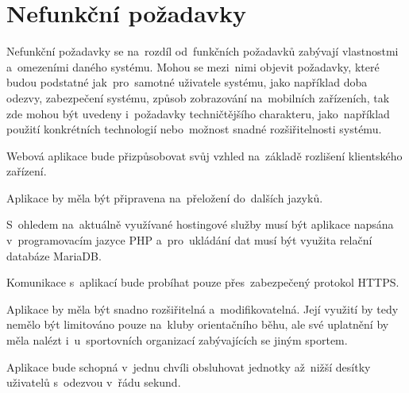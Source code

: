 \section{Nefunkční požadavky}
Nefunkční požadavky se na~rozdíl od~funkčních požadavků zabývají vlastnostmi a~omezeními daného systému. Mohou se mezi~nimi objevit požadavky, které budou podstatné jak~pro~samotné uživatele systému, jako například doba odezvy, zabezpečení systému, způsob zobrazování na~mobilních zařízeních, tak zde mohou být uvedeny i~požadavky techničtějšího charakteru, jako~například použití konkrétních technologií nebo~možnost snadné rozšiřitelnosti systému. \cite{requirements}

\begin{enumerate}[label=\textcolor{decoration}{\textbf{N\arabic*}}, leftmargin=7mm]
	Webová aplikace bude přizpůsobovat svůj vzhled na~základě rozlišení klientského zařízení.

	Aplikace by měla být připravena na~přeložení do~dalších jazyků.

	S~ohledem na~aktuálně využívané hostingové služby musí být aplikace napsána v~programovacím jazyce PHP a~pro~ukládání dat musí být využita relační databáze MariaDB.

	Komunikace s~aplikací bude probíhat pouze přes~zabezpečený protokol HTTPS.

	Aplikace by měla být snadno rozšiřitelná a~modifikovatelná. Její využití by tedy nemělo být limitováno pouze na~kluby orientačního běhu, ale své uplatnění by měla nalézt i~u~sportovních organizací zabývajících se jiným sportem.

	Aplikace bude schopná v~jednu chvíli obsluhovat jednotky až~nižší desítky uživatelů s~odezvou v~řádu sekund.
\end{enumerate}
